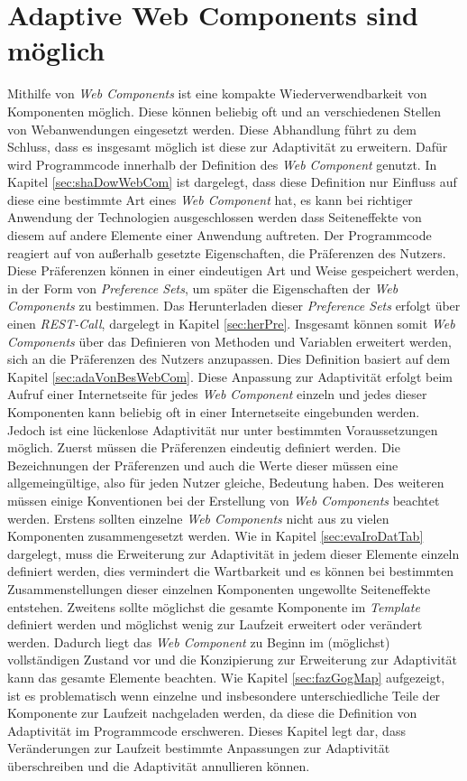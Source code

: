 \documentclass[12pt, paper=a4, bibtotoc, toc=listof, headsepline=true, numbers=endperiod]{scrreprt}
\begin{document}
\chapter{Adaptive Web Components sind möglich}
Mithilfe von \emph{Web Components} ist eine kompakte Wiederverwendbarkeit von Komponenten möglich. Diese können beliebig oft und an verschiedenen Stellen von Webanwendungen eingesetzt werden. Diese Abhandlung führt zu dem Schluss, dass es insgesamt möglich ist diese zur Adaptivität zu erweitern. Dafür wird Programmcode innerhalb der Definition des \emph{Web Component} genutzt. In Kapitel \ref{sec:shaDowWebCom} ist dargelegt, dass diese Definition nur Einfluss auf diese eine bestimmte Art eines \emph{Web Component} hat, es kann bei richtiger Anwendung der Technologien ausgeschlossen werden dass Seiteneffekte von diesem auf andere Elemente einer Anwendung auftreten. Der Programmcode reagiert auf von außerhalb gesetzte Eigenschaften, die Präferenzen des Nutzers. Diese Präferenzen können in einer eindeutigen Art und Weise gespeichert werden, in der Form von \emph{Preference Sets}, um später die Eigenschaften der \emph{Web Components} zu bestimmen. Das Herunterladen dieser \emph{Preference Sets} erfolgt über einen \emph{REST-Call}, dargelegt in Kapitel \ref{sec:herPre}. Insgesamt können somit \emph{Web Components} über das Definieren von Methoden und Variablen erweitert werden, sich an die Präferenzen des Nutzers anzupassen. Dies Definition basiert auf dem Kapitel \ref{sec:adaVonBesWebCom}. Diese Anpassung zur Adaptivität erfolgt beim Aufruf einer Internetseite für jedes \emph{Web Component} einzeln und jedes dieser Komponenten kann beliebig oft in einer Internetseite eingebunden werden.
\newline
Jedoch ist eine lückenlose Adaptivität nur unter bestimmten Voraussetzungen möglich. Zuerst müssen die Präferenzen eindeutig definiert werden. Die Bezeichnungen der Präferenzen und auch die Werte dieser müssen eine allgemeingültige, also für jeden Nutzer gleiche, Bedeutung haben. Des weiteren müssen einige Konventionen bei der Erstellung von \emph{Web Components} beachtet werden. Erstens sollten einzelne \emph{Web Components} nicht aus zu vielen Komponenten zusammengesetzt werden. Wie in Kapitel \ref{sec:evaIroDatTab} dargelegt, muss die Erweiterung zur Adaptivität in jedem dieser Elemente einzeln definiert werden,  dies vermindert die Wartbarkeit und es können bei bestimmten Zusammenstellungen dieser einzelnen Komponenten ungewollte Seiteneffekte entstehen. Zweitens sollte möglichst die gesamte Komponente im \emph{Template} definiert werden und möglichst wenig zur Laufzeit erweitert oder verändert werden. Dadurch liegt das \emph{Web Component} zu Beginn im (möglichst) vollständigen Zustand vor und die Konzipierung zur Erweiterung zur Adaptivität kann das gesamte Elemente beachten. Wie Kapitel \ref{sec:fazGogMap} aufgezeigt, ist es problematisch wenn einzelne und insbesondere unterschiedliche Teile der Komponente zur Laufzeit nachgeladen werden, da diese die Definition von Adaptivität im Programmcode erschweren. Dieses Kapitel legt dar, dass Veränderungen zur Laufzeit bestimmte Anpassungen zur Adaptivität überschreiben und die Adaptivität annullieren können.
\end{document}
